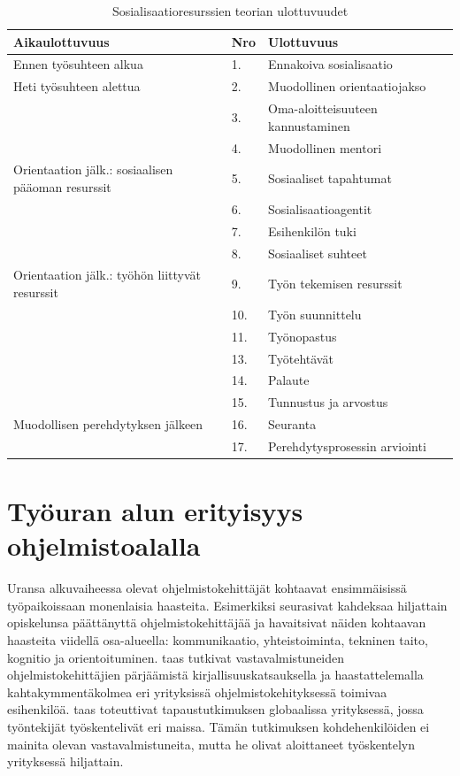 \documentclass[utf8]{gradu3}
\begin{document}
\begin{table}[h]
    \begin{tabular}{llll}
        \toprule
        \textbf{Aikaulottuvuus} & \textbf{Nro} & \textbf{Ulottuvuus} \\
        \midrule
        \midrule
        Ennen työsuhteen alkua & 1. & Ennakoiva sosialisaatio \\
        \midrule
        \midrule
        Heti työsuhteen alettua & 2. & Muodollinen orientaatiojakso \\
        \midrule
        & 3. & Oma-aloitteisuuteen kannustaminen \\
        \midrule
        & 4. & Muodollinen mentori \\
        \midrule
        \midrule
        Orientaation jälk.: sosiaalisen pääoman resurssit & 5. & Sosiaaliset tapahtumat \\
        & 6. & Sosialisaatioagentit \\
        & 7. & Esihenkilön tuki \\
        & 8. & Sosiaaliset suhteet \\
        \midrule
        \midrule
        Orientaation jälk.: työhön liittyvät resurssit & 9. & Työn tekemisen resurssit \\
        & 10. & Työn suunnittelu \\
        & 11. & Työnopastus \\
        & 13. & Työtehtävät \\
        & 14. & Palaute \\
        & 15. & Tunnustus ja arvostus \\
        \midrule
        \midrule
        Muodollisen perehdytyksen jälkeen & 16. & Seuranta \\
        & 17. & Perehdytysprosessin arviointi \\
        \bottomrule
    \end{tabular}
    \caption{Sosialisaatioresurssien teorian ulottuvuudet \parencite{saks-gruman-2012}}
    \label{tbl:srt-ulottuvuudet}
\end{table}

\section{Työuran alun erityisyys ohjelmistoalalla}

Uransa alkuvaiheessa olevat ohjelmistokehittäjät kohtaavat ensimmäisissä työpaikoissaan monenlaisia haasteita. Esimerkiksi \textcite{begel-simon-2008} seurasivat kahdeksaa hiljattain opiskelunsa päättänyttä ohjelmistokehittäjää ja havaitsivat näiden kohtaavan haasteita viidellä osa-alueella: kommunikaatio, yhteistoiminta, tekninen taito, kognitio ja orientoituminen. \textcite{radermacher-ym-2015} taas tutkivat vastavalmistuneiden ohjelmistokehittäjien pärjäämistä kirjallisuuskatsauksella ja haastattelemalla kahtakymmentäkolmea eri yrityksissä ohjelmistokehityksessä toimivaa esihenkilöä. \textcite{britto-ym-2019} taas toteuttivat tapaustutkimuksen globaalissa yrityksessä, jossa työntekijät työskentelivät eri maissa. Tämän tutkimuksen kohdehenkilöiden ei mainita olevan vastavalmistuneita, mutta he olivat aloittaneet työskentelyn yrityksessä hiljattain.
\end{document}

